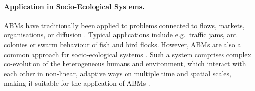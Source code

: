 \paragraph{Application in Socio-Ecological Systems.}
ABMs have traditionally been applied to problems connected to flows, markets, organisations, or diffusion \citep{Bonabeau2002}.
Typical applications include e.g.\ traffic jams, ant colonies or swarm behaviour of fish and bird flocks.
However, ABMs are also a common approach for socio-ecological systems \citep{Muller-Hansen2017}.
Such a system comprises complex co-evolution of the heterogeneous humans and environment, which interact with each other in non-linear, adaptive ways on multiple time and spatial scales, making it suitable for the application of ABMs \citep{Bousquet2004}.




